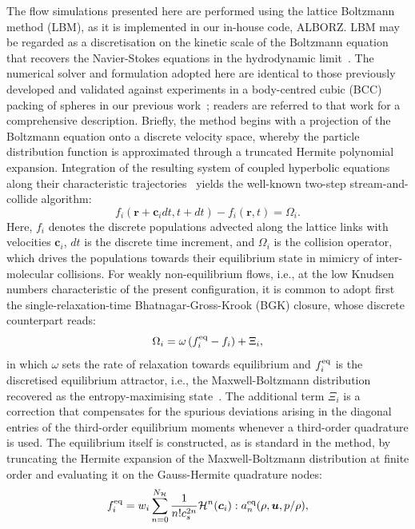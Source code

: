 The flow simulations presented here are performed using the lattice Boltzmann method (LBM), as it is implemented in our in-house code, ALBORZ. LBM may be regarded as a discretisation on the kinetic scale of the Boltzmann equation that recovers the Navier-Stokes equations in the hydrodynamic limit~\cite{Xiaoyi}. The numerical solver and formulation adopted here are identical to those previously developed and validated against experiments in a body-centred cubic (BCC) packing of spheres in our previous work~\cite{neeraj2023}; readers are referred to that work for a comprehensive description. Briefly, the method begins with a projection of the Boltzmann equation onto a discrete velocity space, whereby the particle distribution function is approximated through a truncated Hermite polynomial expansion. Integration of the resulting system of coupled hyperbolic equations along their characteristic trajectories~\cite{Bhadauria} yields the well-known two-step stream-and-collide algorithm:
\begin{equation}
    f_i\left(\bm{r}+\bm{c}_idt, t+dt\right) - f_i\left(\bm{r}, t\right) = \Omega_i.
\end{equation}
Here, $f_i$ denotes the discrete populations advected along the lattice links with velocities $\bm{c}_i$, $dt$ is the discrete time increment, and $\Omega_i$ is the collision operator, which drives the populations towards their equilibrium state in mimicry of inter-molecular collisions. For weakly non-equilibrium flows, i.e., at the low Knudsen numbers characteristic of the present configuration, it is common to adopt first the single-relaxation-time Bhatnagar-Gross-Krook (BGK) closure, whose discrete counterpart reads:
\begin{equation}
    \Omega_i = \omega\left( f^{\rm eq}_i - f_i\right) + \Xi_i,
\end{equation}
in which $\omega$ sets the rate of relaxation towards equilibrium and $f^{\rm eq}_i$ is the discretised equilibrium attractor, i.e., the Maxwell-Boltzmann distribution recovered as the entropy-maximising state~\cite{Bhadauria,Shu}. The additional term $\Xi_i$ is a correction that compensates for the spurious deviations arising in the diagonal entries of the third-order equilibrium moments whenever a third-order quadrature is used. The equilibrium itself is constructed, as is standard in the method, by truncating the Hermite expansion of the Maxwell-Boltzmann distribution at finite order and evaluating it on the Gauss-Hermite quadrature nodes:
\begin{equation}
    f^{\rm eq}_i = w_i \sum_{n=0}^{N_\mathcal{H}}\frac{1}{n!c_s^{2n}} \mathcal{H}^n(\bm{c}_i):a_n^{\rm eq}(\rho,\bm{u},p/\rho),
\end{equation}
